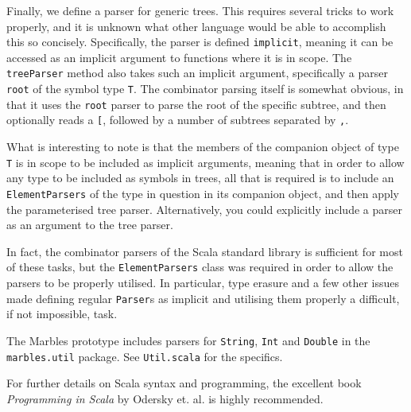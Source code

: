 Finally, we define a parser for generic trees. This requires several tricks
to work properly, and it is unknown what other language would be able to
accomplish this so concisely. Specifically, the parser is defined
\texttt{implicit}, meaning it can be accessed as an implicit argument to
functions where it is in scope. The \texttt{treeParser} method also takes
such an implicit argument, specifically a parser \texttt{root} of the
symbol type \texttt{T}. The combinator parsing itself is somewhat obvious,
in that it uses the \texttt{root} parser to parse the root of the specific
subtree, and then optionally reads a \texttt{[}, followed by a number of
subtrees separated by \texttt{,}.

What is interesting to note is that the members of the companion object of
type \texttt{T} is in scope to be included as implicit arguments, meaning
that in order to allow any type to be included as symbols in trees, all
that is required is to include an \texttt{ElementParsers} of the type in
question in its companion object, and then apply the parameterised tree
parser. Alternatively, you could explicitly include a parser as an argument
to the tree parser. %

In fact, the combinator parsers of the Scala standard library is sufficient
for most of these tasks, but the \texttt{ElementParsers} class was required
in order to allow the parsers to be properly utilised. In particular, type
erasure and a few other issues made defining regular \texttt{Parser}s as
implicit and utilising them properly a difficult, if not impossible, task.  

The Marbles prototype includes parsers for \texttt{String}, \texttt{Int} and
\texttt{Double} in the \texttt{marbles.util} package. See
\texttt{Util.scala} for the specifics.

For further details on Scala syntax and programming, the excellent book
\textit{Programming in Scala} by Odersky et. al. is highly recommended. 


